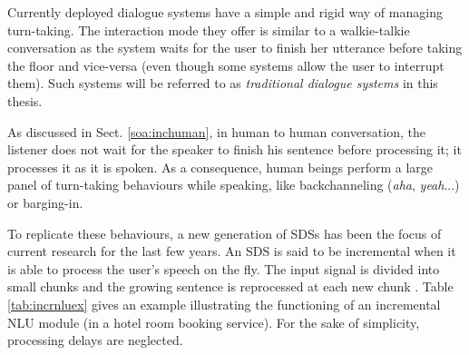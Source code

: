 		Currently deployed dialogue systems have a simple and rigid way of managing turn-taking. The interaction mode they offer is similar to a walkie-talkie conversation as the system waits for the user to finish her utterance before taking the floor and vice-versa (even though some systems allow the user to interrupt them). Such systems will be referred to as \textit{traditional dialogue systems} in this thesis.

		As discussed in Sect. \ref{soa:inchuman}, in human to human conversation, the listener does not wait for the speaker to finish his sentence before processing it; it processes it as it is spoken. As a consequence, human beings perform a large panel of turn-taking behaviours while speaking, like backchanneling (\textit{aha}, \textit{yeah}...) or barging-in.
	
		To replicate these behaviours, a new generation of SDSs has been the focus of current research for the last few years. An SDS is said to be incremental when it is able to process the user's speech on the fly. The input signal is divided into small chunks and the growing sentence is reprocessed at each new chunk \cite{Schlangen2011}. Table \ref{tab:incrnluex} gives an example illustrating the functioning of an incremental NLU module (in a hotel room booking service). For the sake of simplicity, processing delays are neglected.
	
